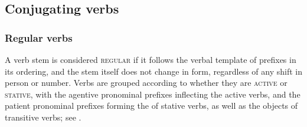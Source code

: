 \documentclass[output=paper]{LSP/langsci}
\begin{document}
\subsection{Conjugating verbs}
\subsubsection{Regular verbs} 
A verb stem is considered \textsc{regular} if it follows the verbal template of prefixes in its ordering, and the stem itself does not change in form, regardless of any shift in person or number.  Verbs are grouped according to whether they are \textsc{active} or \textsc{stative}, with the agentive pronominal prefixes inflecting the active verbs, and the patient pronominal prefixes forming the  of stative verbs, as well as the objects of transitive verbs; see . 
\end{document}
